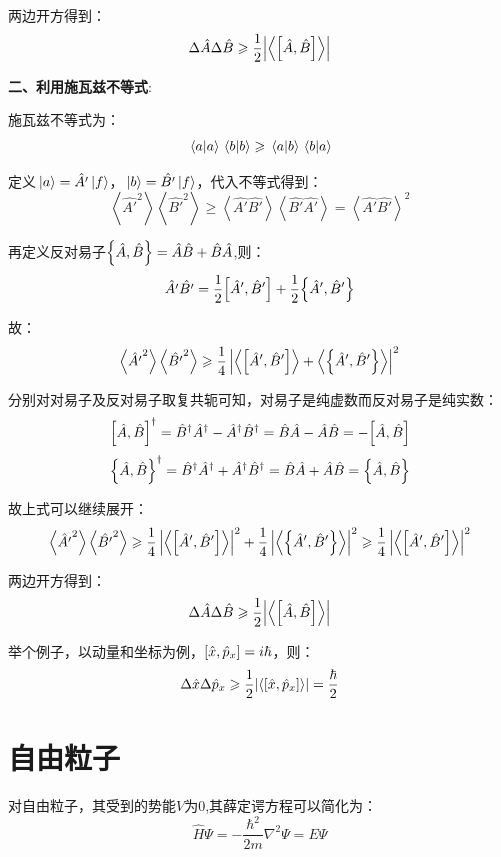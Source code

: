 两边开方得到：
\[\Delta \hat{A}\Delta \hat{B} \geqslant \frac{1}{2}\qty|\left \langle \comm{\hat{A}}{\hat{B}} \right \rangle|\]

\textbf{二、利用施瓦兹不等式}:

施瓦兹不等式为：
\[\bra*{a}\ket*{a}\bra*{b}\ket*{b} \geqslant \bra*{a}\ket*{b}\bra*{b}\ket*{a}\]

定义$\ket*{a}=\hat{A'}\ket*{f}$，$\ket*{b}=\hat{B'}\ket*{f}$，代入不等式得到：
\[\left \langle \hat{A'}^2 \right \rangle\left \langle \hat{B'}^2 \right \rangle \geqslant \left \langle \hat{A'}\hat{B'} \right \rangle\left \langle \hat{B'}\hat{A'} \right \rangle=\left \langle \hat{A'}\hat{B'} \right \rangle^2\]

再定义反对易子$\qty{\hat{A},\hat{B}}=\hat{A}\hat{B}+\hat{B}\hat{A}$,则：
\[\hat{A'}\hat{B'}=\frac{1}{2}\comm{\hat{A}'}{\hat{B}'}+\frac{1}{2}\qty{\hat{A}',\hat{B}'}\]

故：
\[\left \langle \hat{A'}^2 \right \rangle\left \langle \hat{B'}^2 \right \rangle \geqslant \frac{1}{4} \left | \left \langle \comm{\hat{A}'}{\hat{B}'} \right \rangle+\left \langle \qty{\hat{A}',\hat{B}'} \right \rangle \right |^2\]

分别对对易子及反对易子取复共轭可知，对易子是纯虚数而反对易子是纯实数：
\[\comm{\hat{A}}{\hat{B}}^{\dagger}=\hat{B}^{\dagger}\hat{A}^{\dagger}-\hat{A}^{\dagger}\hat{B}^{\dagger}=\hat{B}\hat{A}-\hat{A}\hat{B}=-\comm{\hat{A}}{\hat{B}}\]
\[\qty{\hat{A},\hat{B}}^{\dagger}=\hat{B}^{\dagger}\hat{A}^{\dagger}+\hat{A}^{\dagger}\hat{B}^{\dagger}=\hat{B}\hat{A}+\hat{A}\hat{B}=\qty{\hat{A},\hat{B}}\]

故上式可以继续展开：
\[\left \langle \hat{A'}^2 \right \rangle\left \langle \hat{B'}^2 \right \rangle \geqslant \frac{1}{4} \left | \left \langle \comm{\hat{A}'}{\hat{B}'} \right \rangle \right |^2 +\frac{1}{4} \left |\left \langle \qty{\hat{A}',\hat{B}'} \right \rangle \right |^2 \geqslant \frac{1}{4} \left | \left \langle \comm{\hat{A}'}{\hat{B}'} \right \rangle \right |^2\]

两边开方得到：
\[\Delta \hat{A}\Delta \hat{B} \geqslant \frac{1}{2}\qty|\left \langle \comm{\hat{A}}{\hat{B}} \right \rangle|\]

举个例子，以动量和坐标为例，$\comm{\hat{x}}{\hat{p}_x}=i\hbar$，则：
\[\Delta \hat{x}\Delta \hat{p}_x \geqslant \frac{1}{2}\qty|\left \langle \comm{\hat{x}}{\hat{p}_x} \right \rangle|=\frac{\hbar}{2}\]

\section{自由粒子}
对自由粒子，其受到的势能$V$为0,其薛定谔方程可以简化为：
\[\hat{H}\varPsi=-\frac{\hbar^2}{2m}\nabla^2\varPsi=E\varPsi\]

